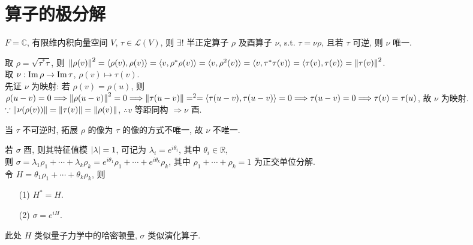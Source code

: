 \documentclass{note}
\begin{document}
\section{算子的极分解}
\begin{thm}
    $F=\mathbb{C}$, 有限维内积向量空间 $V$, $\tau\in\mathcal{L}(V)$, 则 $\exists!$ 半正定算子 $\rho$ 及酉算子 $\nu$, s.t. $\tau=\nu\rho$, 且若 $\tau$ 可逆, 则 $\nu$ 唯一.
\end{thm}
\begin{pf}
    \begin{itemize}
        取 $\rho=\sqrt{\tau^*\tau}$, 则 $\left\lVert\rho(v)\right\rVert^2=\langle\rho(v),\rho(v)\rangle=\langle v,\rho^*\rho(v)\rangle=\langle v,\rho^2(v)\rangle=\langle v,\tau^*\tau(v)\rangle=\langle\tau(v),\tau(v)\rangle=\left\lVert\tau(v)\right\rVert^2$.\\
        取 $\nu:\operatorname{Im}\rho\rightarrow\operatorname{Im}\tau$, $\rho(v)\mapsto\tau(v)$.\\
        先证 $\nu$ 为映射: 若 $\rho(v)=\rho(u)$, 则 $\rho(u-v)=0\Longrightarrow\left\lVert\rho(u-v)\right\rVert^2=0\Longrightarrow\left\lVert\tau(u-v)\right\rVert=^2=\langle\tau(u-v),\tau(u-v)\rangle=0\Longrightarrow\tau(u-v)=0\Longrightarrow\tau(v)=\tau(u)$, 故 $\nu$ 为映射.\\
        $\because\left\lVert\nu(\rho(v))\right\rVert=\left\lVert\tau(v)\right\rVert=\left\lVert\rho(v)\right\rVert$, $\therefore v$ 等距同构 $\Longrightarrow\nu$ 酉.

        当 $\tau$ 不可逆时, 拓展 $\rho$ 的像为 $\tau$ 的像的方式不唯一, 故 $\nu$ 不唯一.
    \end{itemize}
\end{pf}

若 $\sigma$ 酉, 则其特征值模 $\left\lvert\lambda\right\rvert=1$, 可记为 $\lambda_i=e^{i\theta_i}$, 其中 $\theta_i\in\mathbb{R}$,\\
则 $\sigma=\lambda_1\rho_1+\cdots+\lambda_k\rho_k=e^{i\theta_1}\rho_1+\cdots+e^{i\theta_k}\rho_k$, 其中 $\rho_1+\cdots+\rho_k=1$ 为正交单位分解.\\
令 $H=\theta_1\rho_1+\cdots+\theta_k\rho_k$, 则
\begin{itemize}
    \item[(1)] $H^*=H$.
    \item[(2)] $\sigma=e^{iH}$.
\end{itemize}
此处 $H$ 类似量子力学中的哈密顿量, $\sigma$ 类似演化算子.
\ifx\allfiles\undefined
\end{document}

